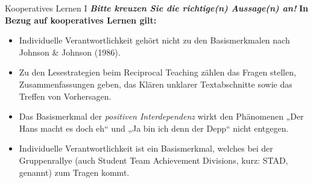 \documentclass[a4paper]{article}
\newcommand{\ACorrectAnswer}{\rlap{$\square$}{\raisebox{2pt}{\large\hspace{1pt}\ding{51}}}\hspace{-2.5pt}}
\newcommand{\AWrongAnswer}{\rlap{$\square$}{\large\hspace{1pt}\ding{55}}}
\newcommand{\AnUnsureAnswer}{\rlap{$\square$}{\large\hspace{1pt}\textbf?}}
\newcommand{\defaultCorrect}{\ding{51}}
\newcommand{\defaultWrong}{\ding{55}}
\newcommand{\defaultUnsure}{\textbf{?}}
\newenvironment{answers}{\begin{itemize}}{\end{itemize}}
\newcommand{\correct}{\defaultCorrect}
\newcommand{\wrong}{\defaultWrong}
\newcommand{\unsure}{\defaultUnsure}
\newenvironment{question}[2]{%
    \section[#1 \normalfont(#2)]{#1\\\small\normalfont\hyperlink{tableofcontents}{zurück zum Inhaltsverzeichnis}}%
}{%
    \newpage%
}
\newcommand{\questiontext}[1]{\textbf{#1}}
\newcommand{\assignment}[1]{\textbf{\textit{#1}}\newline}
\newenvironment{multiple-choice}[1]{%
    \begin{question}{#1}{Multiple Choice}%
    \renewenvironment{answers}{%
        \begin{multiple-choice-list}}{\end{multiple-choice-list}%
    }%
    \renewcommand{\correct}{\ACorrectAnswer}%
    \renewcommand{\wrong}{\AWrongAnswer}%
    \renewcommand{\unsure}{\AnUnsureAnswer}%
}%
{%
    \renewcommand{\correct}{\defaultCorrect}%
    \renewcommand{\wrong}{\defaultWrong}%
    \renewcommand{\unsure}{\defaultUnsure}%
    \end{question}%
}
\begin{document}
\begin{multiple-choice}{Kooperatives Lernen I}
    \assignment{Bitte kreuzen Sie die richtige(n) Aussage(n) an!}
    \questiontext{In Bezug auf kooperatives Lernen gilt:}
    \begin{answers}
        \item[\correct] Individuelle Verantwortlichkeit gehört nicht zu den Basismerkmalen nach Johnson \& Johnson (1986).
        \item[\correct] Zu den Lesestrategien beim Reciprocal Teaching zählen das Fragen stellen, Zusammenfassungen geben, das Klären unklarer Textabschnitte sowie das Treffen von Vorhersagen.
        \item[\wrong] Das Basismerkmal der \textit{positiven Interdependenz} wirkt den Phänomenen „Der Hans macht es doch eh“ und „Ja bin ich denn der Depp“ nicht entgegen.
        \item[\wrong] Individuelle Verantwortlichkeit ist ein Basismerkmal, welches bei der Gruppenrallye (auch Student Team Achievement Divisions, kurz: STAD, genannt) zum Tragen kommt.
    \end{answers}
\end{multiple-choice}
\end{document}
